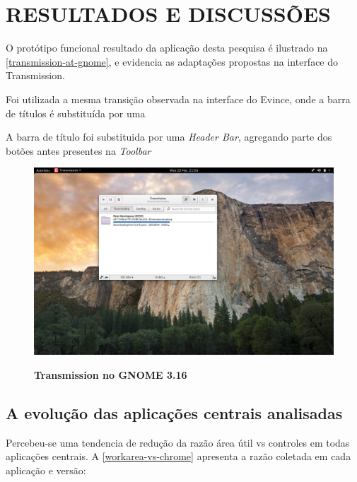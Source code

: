 \chapter{RESULTADOS E DISCUSSÕES}

O protótipo funcional resultado da aplicação desta pesquisa é ilustrado na
\autoref{transmission-at-gnome}, e evidencia as adaptações propostas na
interface do Transmission.

Foi utilizada a mesma transição observada na interface do Evince, onde a barra
de títulos é substituída por uma 

A barra de título foi substituida por uma \textit{Header Bar}, agregando parte
dos botões antes presentes na \textit{Toolbar}

\begin{figure}[!h]
  \begin{center}
    \caption{\textbf{Transmission no GNOME 3.16}}
    \includegraphics [scale=0.2]{image/transmission-gtk3-main.png}
    \label{transmission-at-gnome}
  \end{center}
\end{figure}

\section{A evolução das aplicações centrais analisadas}

Percebeu-se uma tendencia de redução da razão área útil vs controles em todas
aplicações centrais. A \autoref{workarea-vs-chrome} apresenta a razão
coletada em cada aplicação e versão:

\begin{table}[htb]
\end{table}

